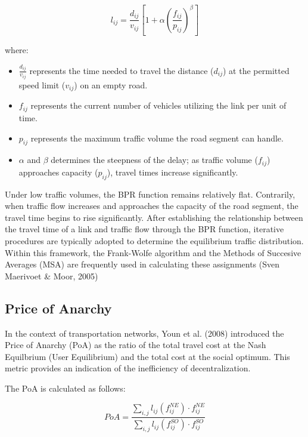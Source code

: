 \begin{equation}
    l_{ij} = \frac{d_{ij}}{v_{ij}} \left[ 1 + \alpha \left( \frac{f_{ij}}{p_{ij}} \right)^\beta \right]
    \label{eq:BPR_function}
\end{equation}

where:

\begin{itemize}
    \item $\frac{d_{ij}}{v_{ij}}$ represents the time needed to travel the distance ($d_{ij}$) at the permitted speed limit ($v_{ij}$) on an empty road.
    \item $f_{ij}$ represents the current number of vehicles utilizing the link per unit of time.
    \item $p_{ij}$ represents the maximum traffic volume the road segment can handle.
    \item $\alpha$ and $\beta$ determines the steepness of the delay; as traffic volume ($f_{ij}$) approaches capacity ($p_{ij}$), travel times increase significantly.
\end{itemize}

Under low traffic volumes, the BPR function remains relatively flat. Contrarily, when traffic flow increases and approaches the capacity of the road segment, the travel time begins to rise significantly.  After establishing the relationship between the travel time of a link and traffic flow through the BPR function, iterative procedures are typically adopted to determine the equilibrium traffic distribution. Within this framework, the Frank-Wolfe algorithm and the Methods of Succesive Averages (MSA) are frequently used in calculating these assignments (Sven Maerivoet \& Moor, 2005)


\subsection{Price of Anarchy}
\label{chap:PoA}

    In the context of transportation networks, Youn et al. (2008) introduced the Price of Anarchy (PoA) as the ratio of the total travel cost at the Nash Equilbrium (User Equilibrium) and the total cost at the social optimum. This metric provides an indication of the inefficiency of decentralization.

The PoA is calculated as follows:

\begin{equation}
    PoA = \frac{\sum_{i,j} l_{ij}(f_{ij}^{NE}) \cdot f_{ij}^{NE}}{\sum_{i,j} l_{ij}(f_{ij}^{SO}) \cdot f_{ij}^{SO}}
    \label{eq:poa_calculation}
\end{equation}

